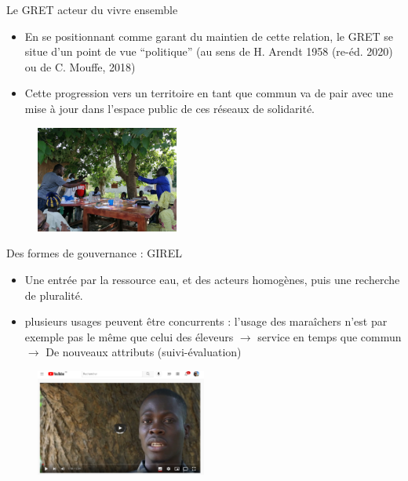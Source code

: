 \documentclass[newPxFont]{beamer}
\begin{document}
\begin{frame}[c]{Le GRET acteur du vivre ensemble}
\vspace{-1cm}

\begin{itemize}
    \item En se positionnant comme garant du maintien de cette relation, le GRET se situe d’un point de vue “politique” (au sens de H. Arendt 1958 (re-éd. 2020) ou de C. Mouffe, 2018)
    \item Cette progression vers un territoire en tant que commun va de pair avec une mise à jour dans l’espace public de ces réseaux de solidarité.
\end{itemize}
\begin{figure}
    \includegraphics[height=3.5cm]{img/atelier_montroland.jpg}
\end{figure}
\end{frame}


\begin{frame}[c]{Des formes de gouvernance : GIREL}
\vspace{-1cm}
\begin{itemize}
    \item Une entrée par la ressource eau, et des acteurs homogènes, puis une recherche de pluralité.
    \item plusieurs usages peuvent être concurrents : l’usage des maraîchers n’est par exemple pas le même que celui des éleveurs $\rightarrow$ service en temps que commun $\rightarrow$ De nouveaux attributs (suivi-évaluation)
\end{itemize}
\begin{figure}
    \includegraphics[height=3.5cm]{img/ComMod_f'eauDiem.png}
\end{figure}

\end{frame}
\end{document}
